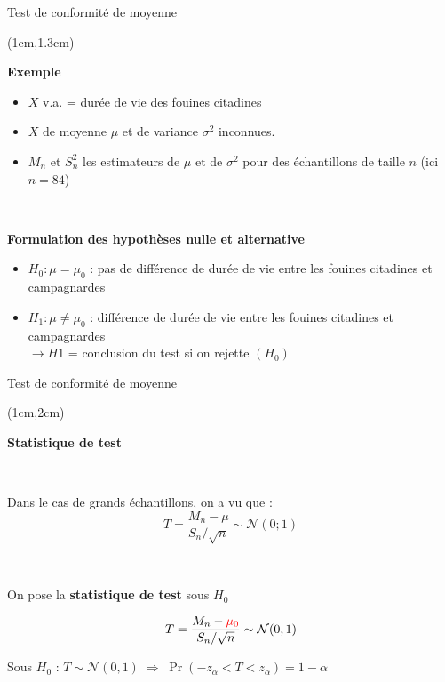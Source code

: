\documentclass{beamer}
\begin{document}

\begin{frame}{Test de conformité de moyenne}
\begin{textblock*}{\textwidth}(1cm,1.3cm)

\begin{center}{\bf \Large Exemple } \end{center}

\begin{itemize}
\item  $X$ v.a. = durée de vie des fouines  citadines 
\item $X$ de moyenne $\mu$ et de variance $\sigma^2$  inconnues. 
\item  $M_n$ et $S^2_n$ les estimateurs de $\mu$ et de $\sigma^2$ pour des échantillons de taille $n$ (ici $n=84$)\\
\end{itemize}

\

{\bf Formulation des hypothèses nulle et alternative}

\begin{itemize}
\item $H_0 : \mu=\mu_0$ : pas de différence de durée de vie entre les fouines citadines et campagnardes
\item $H_1 : \mu \neq \mu_0$ : différence de durée de vie entre les fouines citadines et campagnardes \\
$\rightarrow H1$ = conclusion du test si on rejette $(H_0)$ 
\end{itemize}


\end{textblock*}

\end{frame}
 

\begin{frame}{Test de conformité de moyenne}
\begin{textblock*}{\textwidth}(1cm,2cm)

\begin{center}{\bf \Large Statistique de test} \end{center}

\

Dans le cas de grands échantillons, on a vu que : \\
$$
T = \frac{M_n-\mu}{S_n/\sqrt{n}} \sim \mathcal{N}(0 ; 1)
$$

\

On pose la {\bf statistique de test} sous $H_0$

$$T=\frac{M_n-{\color{red} \mu_0}}{S_n/\sqrt{n}} \sim \mathcal{N}(0,1)$$ 

Sous $H_0$ : $\displaystyle T \sim \mathcal{N}(0,1) \; \Rightarrow \; \Pr(-z_{\alpha}<T<z_{\alpha}) = 1-\alpha$

\end{textblock*}

\end{frame}
\end{document}

